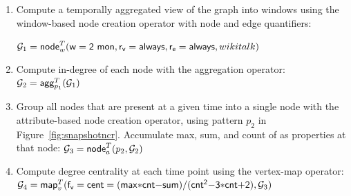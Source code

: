 \begin{enumerate}[itemindent=\dimexpr\labelwidth+\labelsep\relax,leftmargin=0pt]
\item Compute a temporally aggregated view of the graph into windows
  using the window-based node creation operator with 
  node and edge quantifiers:

$\mathcal{G}_1 = \textsf{node}^T_w(\mathsf{w=2~mon},\mathsf{r_v=always},\mathsf{r_e=always},wikitalk)$

\item Compute in-degree of each node with the aggregation operator:  $\mathcal{G}_2 = \textsf{agg}^T_{p_1}(\mathcal{G}_1)$

\item Group all nodes that are present at a given time into a
  single node with the attribute-based node creation operator, using
  pattern $p_2$ in Figure~\ref{fig:snapshotncr}.  Accumulate max,
  sum, and count of  as properties at that
  node:  $\mathcal{G}_3 =\textsf{node}^T_a(p_2,\mathcal{G}_2)$

%

\item Compute degree centrality at each time point using the vertex-map operator:  $\medmuskip=0mu\ttt_4 = \vmap{\mathsf{f_v=cent=(max*cnt-sum)/(cnt^2-3*cnt+2)}, \ttt_3}$
\end{enumerate}

